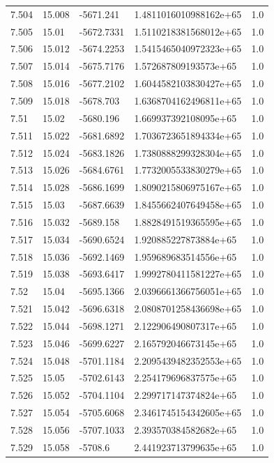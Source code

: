 \begin{tabular}{lllll}
7.504 & 15.008 & -5671.241 & 1.4811016010988162e+65 & 1.0 \\
7.505 & 15.01 & -5672.7331 & 1.5110218381568012e+65 & 1.0 \\
7.506 & 15.012 & -5674.2253 & 1.5415465040972323e+65 & 1.0 \\
7.507 & 15.014 & -5675.7176 & 1.572687809193573e+65 & 1.0 \\
7.508 & 15.016 & -5677.2102 & 1.6044582103830427e+65 & 1.0 \\
7.509 & 15.018 & -5678.703 & 1.6368704162496811e+65 & 1.0 \\
7.51 & 15.02 & -5680.196 & 1.669937392108095e+65 & 1.0 \\
7.511 & 15.022 & -5681.6892 & 1.7036723651894334e+65 & 1.0 \\
7.512 & 15.024 & -5683.1826 & 1.7380888299328304e+65 & 1.0 \\
7.513 & 15.026 & -5684.6761 & 1.7732005533830279e+65 & 1.0 \\
7.514 & 15.028 & -5686.1699 & 1.8090215806975167e+65 & 1.0 \\
7.515 & 15.03 & -5687.6639 & 1.8455662407649458e+65 & 1.0 \\
7.516 & 15.032 & -5689.158 & 1.8828491519365595e+65 & 1.0 \\
7.517 & 15.034 & -5690.6524 & 1.920885227873884e+65 & 1.0 \\
7.518 & 15.036 & -5692.1469 & 1.959689683514556e+65 & 1.0 \\
7.519 & 15.038 & -5693.6417 & 1.9992780411581227e+65 & 1.0 \\
7.52 & 15.04 & -5695.1366 & 2.0396661366756051e+65 & 1.0 \\
7.521 & 15.042 & -5696.6318 & 2.0808701258436698e+65 & 1.0 \\
7.522 & 15.044 & -5698.1271 & 2.122906490807317e+65 & 1.0 \\
7.523 & 15.046 & -5699.6227 & 2.165792046673145e+65 & 1.0 \\
7.524 & 15.048 & -5701.1184 & 2.2095439482352553e+65 & 1.0 \\
7.525 & 15.05 & -5702.6143 & 2.254179696837575e+65 & 1.0 \\
7.526 & 15.052 & -5704.1104 & 2.299717147374824e+65 & 1.0 \\
7.527 & 15.054 & -5705.6068 & 2.3461745154342605e+65 & 1.0 \\
7.528 & 15.056 & -5707.1033 & 2.393570384582682e+65 & 1.0 \\
7.529 & 15.058 & -5708.6 & 2.441923713799635e+65 & 1.0 \\

\end{tabular}
